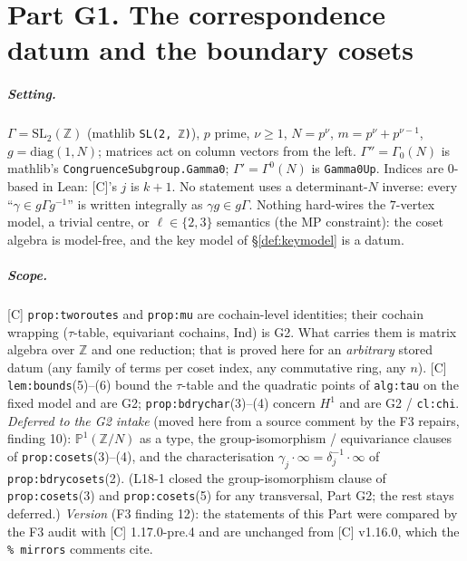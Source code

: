 
\chapter{Part G1. The correspondence datum and the boundary cosets}\label{ch:cosets}

\paragraph{Setting.} $\Gamma=\mathrm{SL}_2(\mathbb Z)$ (mathlib \texttt{SL(2, ℤ)}), $p$ prime, $\nu\ge1$, $N=p^\nu$,
$m=p^\nu+p^{\nu-1}$, $g=\mathrm{diag}(1,N)$; matrices act on column vectors from the left. $\Gamma''=\Gamma_0(N)$ is mathlib's
\texttt{CongruenceSubgroup.Gamma0}; $\Gamma'=\Gamma^0(N)$ is \texttt{Gamma0Up}. Indices are $0$-based in Lean: [C]'s $j$ is
$k+1$. No statement uses a determinant-$N$ inverse: every ``$\gamma\in g\Gamma g^{-1}$'' is written integrally as
$\gamma g\in g\Gamma$. Nothing hard-wires the $7$-vertex model, a trivial centre, or $\ell\in\{2,3\}$ semantics (the MP
constraint): the coset algebra is model-free, and the key model of \S\ref{def:keymodel} is a datum.

\paragraph{Scope.} [C] \texttt{prop:tworoutes} and \texttt{prop:mu} are cochain-level identities; their cochain wrapping
($\tau$-table, equivariant cochains, $\mathrm{Ind}$) is G2. What carries them is matrix algebra over $\mathbb Z$ and one
reduction; that is proved here for an \emph{arbitrary} stored datum (any family of terms per coset index, any commutative
ring, any $n$). [C] \texttt{lem:bounds}(5)--(6) bound the $\tau$-table and the quadratic points of \texttt{alg:tau} on the
fixed model and are G2; \texttt{prop:bdrychar}(3)--(4) concern $H^1$ and are G2 / \texttt{cl:chi}.
\emph{Deferred to the G2 intake} (moved here from a source comment by the F3 repairs, finding 10): $\mathbb P^1(\mathbb Z/N)$ as a
type, the group-isomorphism / equivariance clauses of \texttt{prop:cosets}(3)--(4), and the characterisation
$\gamma_j\cdot\infty=\delta_j^{-1}\cdot\infty$ of \texttt{prop:bdrycosets}(2). (L18-1 closed the group-isomorphism clause of
\texttt{prop:cosets}(3) and \texttt{prop:cosets}(5) for any transversal, Part G2; the rest stays deferred.)
\emph{Version} (F3 finding 12): the statements of this Part were compared by the F3 audit with [C] 1.17.0-pre.4 and are unchanged
from [C] v1.16.0, which the \verb|% mirrors| comments cite.

